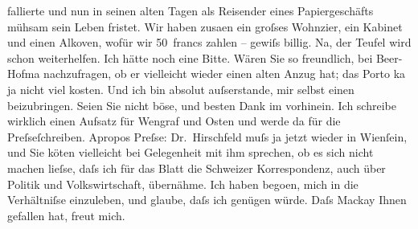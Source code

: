 \begin{ledgroupsized}[t]{13cm}
               fallierte und nun in seinen alten Tagen als Reisender eines Papiergeschäfts mühsam
               sein Leben fristet. Wir haben zusa{\geminationm}en ein groſses
                  Wohnzi{\geminationm}er, ein Kabinet und einen Alkoven, wofür wir
               50 francs zahlen – gewiſs billig. Na, der Teufel wird schon weiterhelfen.\pend
           \pstart
           Ich hätte noch eine Bitte. Wären Sie so freundlich, bei Beer-Hofma{\geminationn} nachzufragen, ob er vielleicht wieder einen {\pb}alten Anzug hat; das Porto ka{\geminationn} ja nicht viel kosten.
               Und ich bin absolut auſserstande, mir selbst einen beizubringen. Seien Sie nicht
               böse, und besten Dank im vorhinein.\pend
           \pstart
           Ich schreibe wirklich einen Aufsatz für Wengraf und Osten und werde da{\geminationn}{ }\label{K_L00499_1v}\label{K_L00499_1h} für die Preſseſchreiben. Apropos Preſse: Dr. Hirschfeld muſs ja jetzt
               wieder in Wienſein, und Sie kö{\geminationn}ten
               vielleicht bei Gelegenheit mit ihm sprechen, ob es sich nicht machen lieſse, daſs ich
               für das Blatt die Schweizer Korrespondenz, auch
               über Politik und Volkswirtschaft, übernähme. Ich haben bego{\geminationn}en, mich in die Verhältniſse einzuleben, und glaube,
               daſs ich genügen würde.\pend
           \pstart
           Daſs Mackay Ihnen gefallen hat, freut mich.

\end{ledgroupsized}
